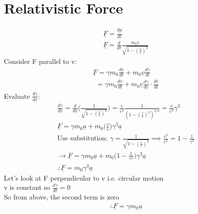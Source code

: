 \documentclass[a4paper, 11pt, fleqn, normalem]{report}
\begin{document}
\section{Relativistic Force}
\vspace{-24pt}
\begin{gather*}
    \underline{F} = \frac{d\underline{p}}{dt} \\
    \underline{F} = \frac{d}{dt}\frac{m_{0}\underline{v}}{\sqrt{1 - (\tfrac{v}{c})^{2}}}
\end{gather*}
Consider F parallel to v:
\begin{gather*}
    \underline{F} = \gamma m_{0}\frac{d\underline{v}}{dt} + m_{0}\underline{v}\frac{d\gamma}{dt} \\
    ~~ = \gamma m_{0}\frac{d\underline{v}}{dt} + m_{0}\underline{v}\frac{d\gamma}{d\underline{v}}\cdot\frac{d\underline{v}}{dt}
\end{gather*}
Evaluate $\frac{d\gamma}{d\underline{v}}$:
\begin{gather*}
    \frac{d\gamma}{d\underline{v}} = \frac{d}{d\underline{v}}\Big(\frac{1}{\sqrt{1 - (\tfrac{v}{c})^{2}}}\Big) = \frac{v}{c^{2}}\frac{1}{(1 - (\tfrac{v}{c})^{2})^{3/2}} = \frac{v}{c^{2}}\gamma^{3} \\
    \underline{F} = \gamma m_{0}\underline{a} + m_{0}\Big(\frac{v}{c}\Big)\gamma^{3}\underline{a} \\
    \text{Use substitution: }\gamma = \frac{1}{\sqrt{1 - (\tfrac{v}{c})^{2}}} \implies \frac{v^{2}}{c^{2}} = 1 - \frac{1}{\gamma^{2}} \\
    \rightarrow \underline{F} = \gamma m_{0}\underline{a} + m_{0}\Big(1 - \frac{1}{\gamma^{2}}\Big)\gamma^{3}\underline{a} \\
    \therefore \underline{F} = m_{0}\gamma^{3}\underline{a}
\end{gather*}
Let's look at F perpendicular to v i.e. circular motion \\
v is constant so $\frac{d\gamma}{dt} = 0$ \\
So from above, the second term is zero
\begin{gather*}
    \therefore \underline{F} = \gamma m_{0}\underline{a}
\end{gather*}
\end{document}

